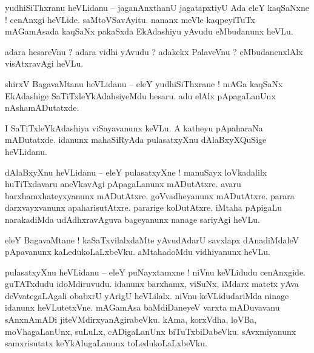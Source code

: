 \documentclass{article}
\begin{document}

\begin{mn}%
yudhiSiThxranu heVLidanu -- jaganAnxthanU jagatapxtiyU Ada eleY kaqSaNxne ! cenAnxgi heVLide. 
saMtoVSavAyitu. nananx meVle kaqpeyiTuTx mAGamAsada kaqSaNx pakaSxda EkAdashiyu yAvudu eMbudanunx 
heVLu.
\end{mn}

\begin{mn}%
adara hesareVnu ? adara vidhi yAvudu ? adakekx PalaveVnu ? eMbudanenxlAlx visAtxravAgi heVLu.
\end{mn}

\begin{mn}%
shirxV BagavaMtanu heVLidanu -- eleY yudhiSiThxrane ! mAGa kaqSaNx EkAdashige SaTiTxleYkAdahsiyeMdu 
hesaru. adu elAlx pApagaLanUnx nAshamADutatxde.
\end{mn}

\begin{mn}%
I SaTiTxleYkAdashiya viSayavanunx keVLu. A katheyu pApaharaNa mADutatxde. idanunx mahaSiRyAda 
pulasatxyXnu dAlaBxyXQuSige heVLidanu.
\end{mn}

\begin{mn}%
dAlaBxyXnu heVLidanu -- eleY pulasatxyXne ! manuSayx loVkadalilx huTiTxdavaru aneVkavAgi 
pApagaLanunx mADutAtxre. avaru barxhamxhateyxyanunx mADutAtxre. goVvadheyanunx mADutAtxre. parara 
darxvayxvanunx apaharisutAtxre. pararige koDutAtxre. iMtaha pApigaLu narakadiMda udAdhxravAguva 
bageyanunx nanage sariyAgi heVLu.
\end{mn}

\begin{mn}%
eleY BagavaMtane ! kaSaTxvilalxdaMte yAvudAdarU savxlapx dAnadiMdaleV pApavanunx kaLedukoLaLxbeVku. 
aMtahadoMdu vidhiyanunx heVLu.
\end{mn}

\begin{mn}%
pulasatxyXnu heVLidanu -- eleY puNayxtamxne ! niVnu keVLidudu cenAnxgide. guTATxdudu idoMdiruvudu. 
idanunx barxhamx, viSuNx, iMdarx matetx yAva deVvategaLAgali obabxrU yArigU heVLilalx. niVnu 
keVLidudariMda ninage idanunx heVLutetxVne. mAGamAsa baMdiDaneyeV varxta mADuvavanu sAnxnAmADi 
jiteVMdirxyanAgirabeVku. kAma, korxVdha, loVBa, moVhagaLanUnx, suLuLx, cADigaLanUnx 
biTuTxbiDabeVku. sAvxmiyanunx samxrisutatx keYkAlugaLanunx toLedukoLaLxbeVku.
\end{mn}
\end{document}
